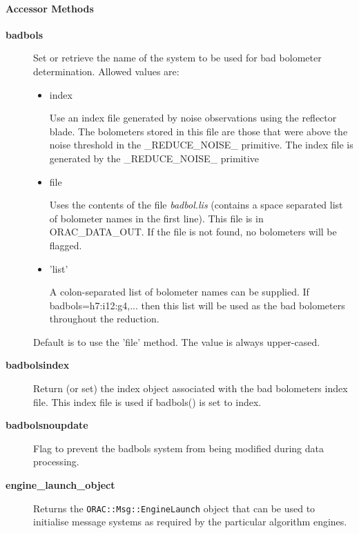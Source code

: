 \paragraph*{Accessor Methods\label{ORAC::Calib::SCUBA_Accessor_Methods}}\begin{description}
\item[\textbf{badbols}] \mbox{}

Set or retrieve the name of the system to be used for bad bolometer
determination. Allowed values are:

\begin{itemize}
\item index

Use an index file generated by noise observations
using the reflector blade. The bolometers stored in this
file are those that were above the noise threshold in 
the \_REDUCE\_NOISE\_ primitive. The index file is generated
by the \_REDUCE\_NOISE\_ primitive

\item file

Uses the contents of the file \emph{badbol.lis} (contains a space
separated list of bolometer names in the first line). This
file is in ORAC\_DATA\_OUT. If the file is not found, no
bolometers will be flagged.

\item 'list'

A colon-separated list of bolometer names can be supplied.
If badbols=h7:i12:g4,... then this list will be used
as the bad bolometers throughout the reduction.

\end{itemize}


Default is to use the 'file' method.
The value is always upper-cased.

\item[\textbf{badbolsindex}] \mbox{}

Return (or set) the index object associated with the bad bolometers
index file. This index file is used if badbols() is set to index.

\item[\textbf{badbolsnoupdate}] \mbox{}

Flag to prevent the badbols system from being modified during data
processing.

\item[\textbf{engine\_launch\_object}] \mbox{}

Returns the \texttt{ORAC::Msg::EngineLaunch} object that can be used
to initialise message systems as required by the particular
algorithm engines.


\end{description}
